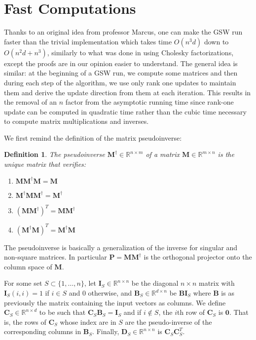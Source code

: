 \documentclass[12pt]{article}
\newtheorem{definition}[theorem]{Definition}
\begin{document}
\section{Fast Computations}\label{fast_computations}
Thanks to an original idea from professor Marcus, one can make the GSW run faster than the trivial implementation which takes time $O(n^3d)$ down to $O(n^2d + n^3)$, similarly to what was done in \cite{harshaw2019balancing} using Cholesky factorizations, except the proofs are in our opinion easier to understand. The general idea is similar: at the beginning of a GSW run, we compute some matrices and then during each step of the algorithm, we use only rank one updates to maintain them and derive the update direction from them at each iteration. This results in the removal of an $n$ factor from the asymptotic running time since rank-one update can be computed in quadratic time rather than the cubic time necessary to compute matrix multiplications and inverses.

We first remind the definition of the matrix pseudoinverse:
\begin{definition}
The pseudoinverse $\textbf{M}^\dagger\in\mathbb{R}^{n\times m}$ of a matrix $\textbf{M}\in\mathbb{R}^{m\times n}$ is the unique matrix that verifies:
\begin{enumerate}
\item $\textbf{M}\textbf{M}^\dagger\textbf{M}=\textbf{M}$
\item $\textbf{M}^\dagger\textbf{M}\textbf{M}^\dagger=\textbf{M}^\dagger$
\item $(\textbf{M}\textbf{M}^\dagger)^T=\textbf{M}\textbf{M}^\dagger$
\item $(\textbf{M}^\dagger\textbf{M})^T=\textbf{M}^\dagger\textbf{M}$
\end{enumerate}
\end{definition}
The pseudoinverse is basically a generalization of the inverse for singular and non-square matrices. In particular $\textbf{P}=\textbf{M}\textbf{M}^\dagger$ is the orthogonal projector onto the column space of $\textbf{M}$.

For some set $S\subset\{1,\dots,n\}$, let $\textbf{I}_S\in\mathbb{R}^{n\times n}$ be the diagonal $n\times n$ matrix with $\textbf{I}_S(i,i) =1$ if $i\in S$ and $0$ otherwise, and $\textbf{B}_S\in\mathbb{R}^{d\times n}$ be $\textbf{BI}_S$ where $\textbf{B}$ is as previously the matrix containing the input vectors as columns. We define $\textbf{C}_S\in\mathbb{R}^{n\times d}$ to be such that $\textbf{C}_S\textbf{B}_S=\textbf{I}_S$ and if $i\not\in S$, the $i$th row of $\textbf{C}_S$ is $\textbf{0}$. That is, the rows of $\textbf{C}_S$ whose index are in $S$ are the pseudo-inverse of the corresponding columns in $\textbf{B}_S$. Finally, $\textbf{D}_S\in\mathbb{R}^{n\times n}$ is $\textbf{C}_S\textbf{C}_S^T$.
\end{document}
